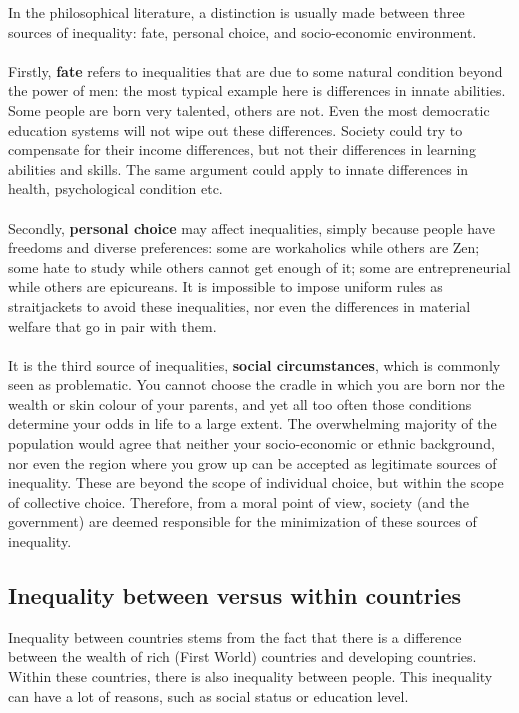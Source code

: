 \documentclass[../summary.tex]{subfiles}
\begin{document}
	In the philosophical literature, a distinction is usually made between three sources of inequality: fate, personal choice, and socio-economic environment.
	\\\\
	Firstly, \textbf{fate} refers to inequalities that are due to some natural condition beyond the power of men: the most typical example here is differences in innate abilities. Some people are born very talented, others are not. Even the most democratic education systems will not wipe out these differences. Society could try to compensate for their income differences, but not their differences in learning abilities and skills. The same argument could apply to innate differences in health, psychological condition etc. 
	\\\\
	Secondly, \textbf{personal choice} may affect inequalities, simply because people have freedoms and diverse preferences: some are workaholics while others are Zen; some hate to study while others cannot get enough of it; some are entrepreneurial while others are epicureans. It is impossible to impose uniform rules as straitjackets to avoid these inequalities, nor even the differences in material welfare that go in pair with them.
	\\\\
	It is the third source of inequalities, \textbf{social circumstances}, which is commonly seen as problematic. You cannot choose the cradle in which you are born nor the wealth or skin colour of your parents, and yet all too often those conditions determine your odds in life to a large extent. The overwhelming majority of the population would agree that neither your socio-economic or ethnic background, nor even the region where you grow up can be accepted as legitimate sources of inequality. These are beyond the scope of individual choice, but within the scope of collective choice. Therefore, from a moral point of view, society (and the government) are deemed responsible for the minimization of these sources of inequality. 
	
	\subsection{Inequality between versus within countries}
	
	Inequality between countries stems from the fact that there is a difference between the wealth of rich (First World) countries and developing countries. Within these countries, there is also inequality between people. This inequality can have a lot of reasons, such as social status or education level.
	
\end{document}
